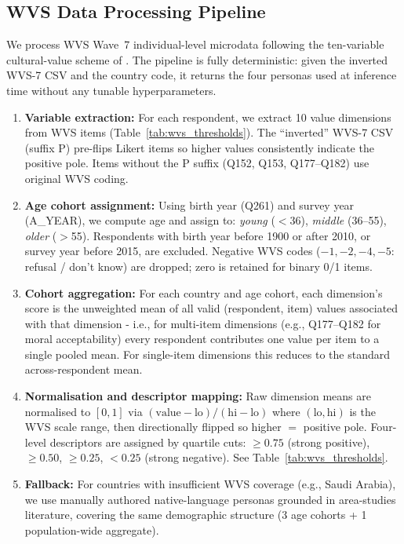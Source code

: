 \documentclass{article}
\begin{document}
\subsection{WVS Data Processing Pipeline}
\label{app:wvs_pipeline}

We process WVS Wave~7 individual-level microdata following the ten-variable cultural-value scheme of \citet{greco2026personas}. The pipeline is fully deterministic: given the inverted WVS-7 CSV and the country code, it returns the four personas used at inference time without any tunable hyperparameters.
\begin{enumerate}
  \item \textbf{Variable extraction:} For each respondent, we extract 10 value dimensions from WVS items (Table~\ref{tab:wvs_thresholds}). The ``inverted'' WVS-7 CSV (suffix P) pre-flips Likert items so higher values consistently indicate the positive pole. Items without the P suffix (Q152, Q153, Q177--Q182) use original WVS coding.
  \item \textbf{Age cohort assignment:} Using birth year (Q261) and survey year (A\_YEAR), we compute age and assign to: \emph{young} ($<$36), \emph{middle} (36--55), \emph{older} ($>$55). Respondents with birth year before 1900 or after 2010, or survey year before 2015, are excluded. Negative WVS codes ($-1, -2, -4, -5$: refusal / don't know) are dropped; zero is retained for binary 0/1 items.
  \item \textbf{Cohort aggregation:} For each country and age cohort, each dimension's score is the unweighted mean of all valid (respondent, item) values associated with that dimension - i.e., for multi-item dimensions (e.g., Q177--Q182 for moral acceptability) every respondent contributes one value per item to a single pooled mean. For single-item dimensions this reduces to the standard across-respondent mean.
  \item \textbf{Normalisation and descriptor mapping:} Raw dimension means are normalised to $[0,1]$ via $(\text{value}-\text{lo})/(\text{hi}-\text{lo})$ where $(\text{lo},\text{hi})$ is the WVS scale range, then directionally flipped so higher $=$ positive pole. Four-level descriptors are assigned by quartile cuts: $\geq 0.75$ (strong positive), $\geq 0.50$, $\geq 0.25$, $< 0.25$ (strong negative). See Table~\ref{tab:wvs_thresholds}.
  \item \textbf{Fallback:} For countries with insufficient WVS coverage (e.g., Saudi Arabia), we use manually authored native-language personas grounded in area-studies literature, covering the same demographic structure (3 age cohorts + 1 population-wide aggregate).
\end{enumerate}
\end{document}
